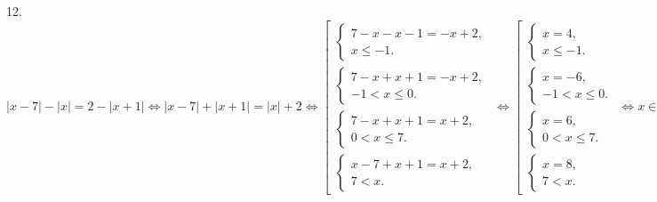 12. $|x-7|-|x|=2-|x+1|\Leftrightarrow|x-7|+|x+1|=|x|+2\Leftrightarrow \left[\begin{array}{l}\begin{cases} 7-x-x-1=-x+2,\\ x\leqslant-1.\end{cases}\\
\begin{cases} 7-x+x+1=-x+2,\\ -1<x\leqslant0.\end{cases}\\ \begin{cases} 7-x+x+1=x+2,\\ 0<x\leqslant7.\end{cases}\\
\begin{cases} x-7+x+1=x+2,\\ 7< x.\end{cases}\end{array}\right.\Leftrightarrow \left[\begin{array}{l}\begin{cases} x=4,\\ x\leqslant-1.\end{cases}\\
\begin{cases} x=-6,\\ -1<x\leqslant0.\end{cases}\\ \begin{cases} x=6,\\ 0<x\leqslant7.\end{cases}\\
\begin{cases} x=8,\\ 7< x.\end{cases}\end{array}\right.\Leftrightarrow x\in\{6; 8\}.$\\
